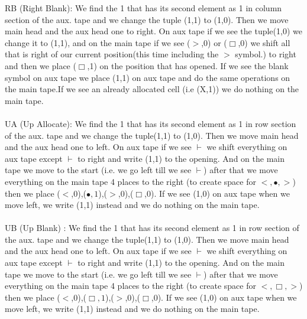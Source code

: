 \documentclass[12pt]{article}
\begin{document}
RB (Right Blank): We find the 1 that has its second element as 1 in column section of the aux. tape and we change the tuple (1,1) to (1,0). Then we move main head and the aux head one to right. On aux tape if we see the tuple(1,0) we change it to (1,1), and on the main tape if we see ($>$,0) or ($\Box$,0) we shift all that is right of our current position(this time including the $>$ symbol.) to right and then we place ($\Box$,1) on the position that has opened. If we see the blank symbol on aux tape we place (1,1) on aux tape and do the same operations on the main tape.If we see an already allocated cell (i.e (X,1)) we do nothing on the main tape.\\
\\
UA (Up Allocate): We find the 1 that has its second element as 1 in row section of the aux. tape and we change the tuple(1,1) to (1,0). Then we move main head and the aux head one to left. On aux tape if we see $\vdash$ we shift everything on aux tape except $\vdash$ to right and write (1,1) to the opening. And on the main tape we move to the start (i.e. we go left till we see $\vdash$) after that we move everything on the main tape 4 places to the right (to create space for $<,\bullet,>$) then we place ($<$,0),($\bullet,1$),($>$,0),($\Box$,0). If we see (1,0) on aux tape when we move left, we write (1,1) instead and we do nothing on the main tape.\\
\\
UB (Up Blank) : We find the 1 that has its second element as 1 in row section of the aux. tape and we change the tuple(1,1) to (1,0). Then we move main head and the aux head one to left. On aux tape if we see $\vdash$ we shift everything on aux tape except $\vdash$ to right and write (1,1) to the opening. And on the main tape we move to the start (i.e. we go left till we see $\vdash$) after that we move everything on the main tape 4 places to the right (to create space for $<,\Box,>$) then we place ($<$,0),($\Box,1$),($>$,0),($\Box$,0). If we see (1,0) on aux tape when we move left, we write (1,1) instead and we do nothing on the main tape.\\
\\
\end{document}
